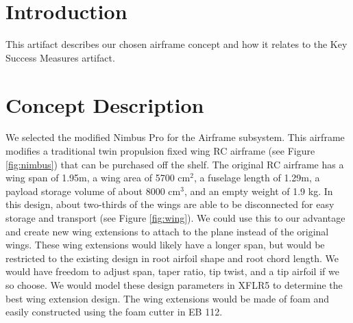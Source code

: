 \documentclass[]{auvsi_doc}
\begin{document}
\begin{AUVSITitlePage}
\begin{artifacttable}

\end{artifacttable}
\end{AUVSITitlePage}

\section{Introduction}

This artifact describes our chosen airframe concept and how it relates to the Key Success Measures artifact.

\section{Concept Description}

We selected the modified Nimbus Pro for the Airframe subsystem. This airframe modifies a traditional twin propulsion fixed wing RC airframe (see Figure \ref{fig:nimbus}) that can be purchased off the shelf. The original RC airframe has a wing span of 1.95m, a wing area of 5700 cm$^2$, a fuselage length of 1.29m, a payload storage volume of about 8000 cm$^3$, and an empty weight of 1.9 kg. In this design, about two-thirds of the wings are able to be disconnected for easy storage and transport (see Figure \ref{fig:wing}). We could use this to our advantage and create new wing extensions to attach to the plane instead of the original wings. These wing extensions would likely have a longer span, but would be restricted to the existing design in root airfoil shape and root chord length. We would have freedom to adjust span, taper ratio, tip twist, and a tip airfoil if we so choose. We would model these design parameters in XFLR5 to determine the best wing extension design. The wing extensions would be made of foam and easily constructed using the foam cutter in EB 112.
\end{document}
